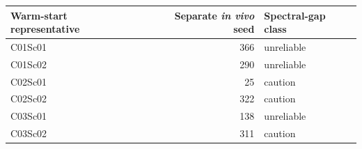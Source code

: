\begin{table}[!htbp]
\vspace{0.8em}
\begin{tabular}{@{}lrl@{}}
\toprule
Warm-start representative & Separate \textit{in vivo} seed & Spectral-gap class \\
\midrule
C01Sc01 & 366 & unreliable \\
C01Sc02 & 290 & unreliable \\
C02Sc01 & 25 & caution \\
C02Sc02 & 322 & caution \\
C03Sc01 & 138 & unreliable \\
C03Sc02 & 311 & caution \\
\bottomrule
\end{tabular}
\end{table}
